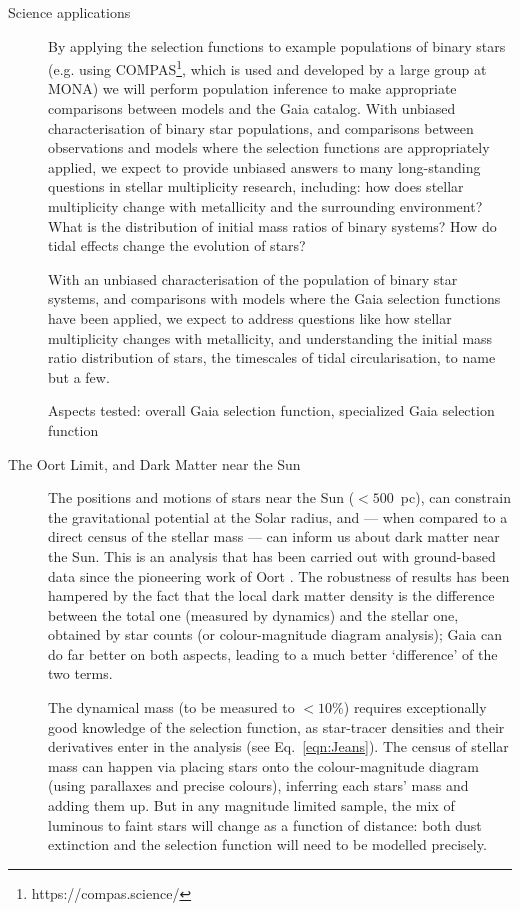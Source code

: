 \begin{workpackage}{Science applications}
\begin{wpobjectives}
\begin{description}
{        By applying the selection functions to example populations of binary stars (e.g. using COMPAS\footnote{https://compas.science/}, which is used and developed by a large group at MONA) we will perform population inference to make appropriate comparisons between models and the Gaia catalog. With unbiased characterisation of binary star populations, and comparisons between observations and models where the selection functions are appropriately applied, we expect to provide unbiased answers to many long-standing questions in stellar multiplicity research, including: how does stellar multiplicity change with metallicity and the surrounding environment? What is the distribution of initial mass ratios of binary systems? How do tidal effects change the evolution of stars? 

        With an unbiased characterisation of the population of binary star systems, and comparisons with models where the Gaia selection functions have been applied, we expect to address questions like how stellar multiplicity changes with metallicity, and understanding the initial mass ratio distribution of stars, the timescales of tidal circularisation, to name but a few.
        
        \textsf{Aspects tested: overall Gaia selection function, specialized Gaia selection function}
        }
      
      \item[The Oort Limit, and Dark Matter near the Sun]{
        The positions and motions of stars near the Sun ($<500$~pc), can constrain the gravitational potential at the Solar radius, and --- when compared to a direct census of the stellar mass --- can inform us about dark matter near the Sun. This is an analysis that has been carried out with ground-based data since the pioneering work of Oort \citep[e.g.][]{Read2014}. The robustness of results has been hampered by the fact that the local dark matter density is the difference between the total one (measured by dynamics) and the stellar one, obtained by star counts (or colour-magnitude diagram analysis); Gaia can do far better on both aspects, leading to a much better `difference' of the two terms. 
      
        The dynamical mass (to be measured to $<10$\%) requires exceptionally good knowledge of the selection function, as star-tracer densities and their derivatives enter in the analysis (see Eq.~\ref{eqn:Jeans}). The census of stellar mass can happen via placing stars onto the colour-magnitude diagram (using parallaxes and precise colours), inferring each stars' mass and adding them up. But in any magnitude limited sample, the mix of luminous to faint stars will change as a function of distance: both dust extinction and the selection function will need to be modelled precisely. 
      
}
\end{description}
\end{wpobjectives}
\end{workpackage}
